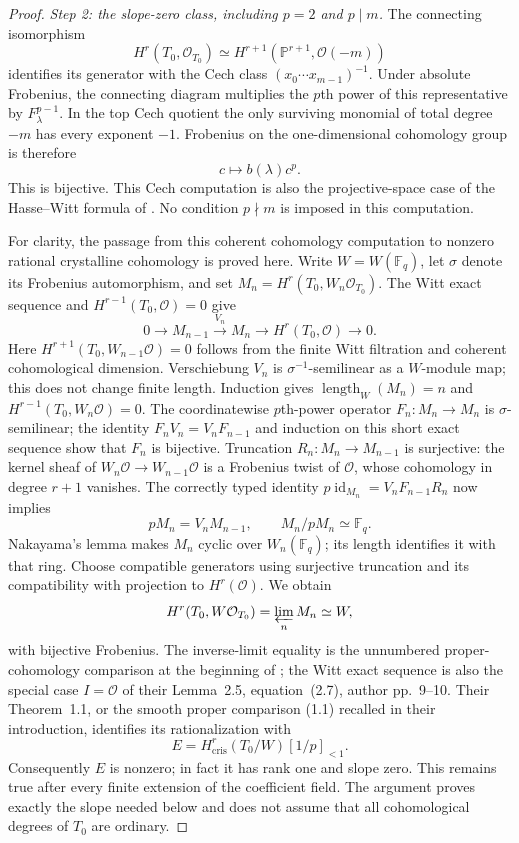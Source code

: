 \begin{proof}
\emph{Step 2: the slope-zero class, including $p=2$ and $p\mid m$.}
The connecting isomorphism
\[
 H^r(T_0,\mathcal O_{T_0})
  \simeq H^{r+1}(\mathbb P^{r+1},\mathcal O(-m))
\]
identifies its generator with the Cech class
$(x_0\cdots x_{m-1})^{-1}$. Under absolute Frobenius, the connecting
diagram multiplies the $p$th power of this representative by
$F_\lambda^{p-1}$. In the top Cech quotient the only surviving monomial
of total degree $-m$ has every exponent $-1$. Frobenius on the
one-dimensional cohomology group is therefore
\[
                         c\longmapsto b(\lambda)c^p.
\]
This is bijective. This Cech computation is also the projective-space
case of the Hasse--Witt formula of
\citet[Section~2, Corollaries 2.3 and 2.5, author pp.~8--9]{D_HuangLianYauYuHasse}.
No condition $p\nmid m$ is imposed in this computation.

For clarity, the passage from this coherent cohomology computation to
nonzero rational crystalline cohomology is proved here. Write
$W=W(\mathbb F_q)$, let $\sigma$ denote its Frobenius automorphism, and set
$M_n=H^r(T_0,W_n\mathcal O_{T_0})$. The Witt exact sequence and
$H^{r-1}(T_0,\mathcal O)=0$ give
\[
 0\longrightarrow M_{n-1}\xrightarrow{V_n}M_n
       \longrightarrow H^r(T_0,\mathcal O)\longrightarrow0.
\]
Here $H^{r+1}(T_0,W_{n-1}\mathcal O)=0$ follows from the finite Witt
filtration and coherent cohomological dimension. Verschiebung $V_n$ is
$\sigma^{-1}$-semilinear as a $W$-module map; this does not change
finite length. Induction gives
$\operatorname{length}_W(M_n)=n$ and
$H^{r-1}(T_0,W_n\mathcal O)=0$. The coordinatewise $p$th-power
operator $F_n:M_n\to M_n$ is $\sigma$-semilinear; the identity
$F_nV_n=V_nF_{n-1}$ and induction on this short exact sequence show
that $F_n$ is bijective. Truncation
$R_n:M_n\to M_{n-1}$ is surjective: the kernel sheaf of
$W_n\mathcal O\to W_{n-1}\mathcal O$ is a Frobenius twist of
$\mathcal O$, whose cohomology in degree $r+1$ vanishes.
The correctly typed identity
$p\operatorname{id}_{M_n}=V_nF_{n-1}R_n$ now implies
\[
 pM_n=V_n M_{n-1},\qquad M_n/pM_n\simeq\mathbb F_q.
\]
Nakayama's lemma makes $M_n$ cyclic over $W_n(\mathbb F_q)$; its
length identifies it with that ring. Choose compatible generators using
surjective truncation and its compatibility with projection to
$H^r(\mathcal O)$. We obtain
\[
 H^r(T_0,W\mathcal O_{T_0})
       =\varprojlim_n M_n\simeq W,
\]
with bijective Frobenius. The inverse-limit equality is the unnumbered
proper-cohomology comparison at the beginning of
\citet[Section~2, author pp.~6--7]{D_BerthelotBlochEsnault2007};
the Witt exact sequence is also the special case $I=\mathcal O$ of
their Lemma~2.5, equation~(2.7), author pp.~9--10.
Their Theorem~1.1, or the smooth proper comparison (1.1) recalled
in their introduction, identifies its rationalization with
\[
 E=H^r_{\mathrm{cris}}(T_0/W)[1/p]_{<1}.
\]
Consequently $E$ is nonzero; in fact it has rank one and slope zero.
This remains true after every finite extension of the coefficient
field. The argument proves exactly the slope needed below and does
not assume that all cohomological degrees of $T_0$ are ordinary.


\end{proof}
